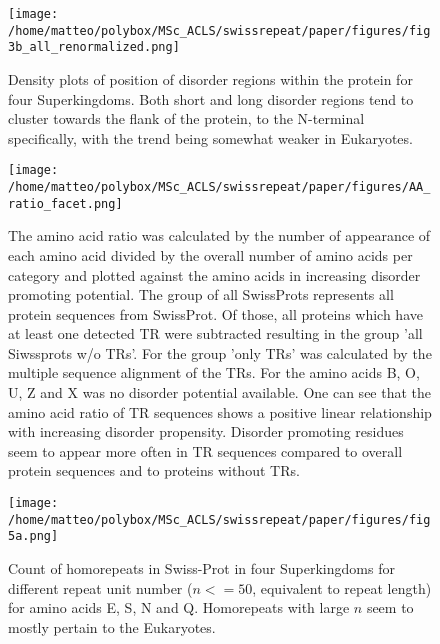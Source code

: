\documentclass[a4,center,fleqn]{NAR}
\begin{document}
\begin{figure}[t]
\begin{center}
\texttt{[image: /home/matteo/polybox/MSc\_ACLS/swissrepeat/paper/figures/fig3b\_all\_renormalized.png]}
\end{center}
\caption{ Density plots of position of disorder regions within the protein for four Superkingdoms. Both short and long disorder regions tend to cluster towards the flank of the protein, to the N-terminal specifically, with the trend being somewhat weaker in Eukaryotes.}
\label{sup:fig3b}
\end{figure}

\begin{figure*}[t]
\begin{center}
\texttt{[image: /home/matteo/polybox/MSc\_ACLS/swissrepeat/paper/figures/AA\_ratio\_facet.png]}
\end{center}
\caption{The amino acid ratio was calculated by the number of appearance of each amino acid divided by the overall number of amino acids per category and plotted against the amino acids in increasing disorder promoting potential. The group of all SwissProts represents all protein sequences from SwissProt. Of those, all proteins which have at least one detected TR were subtracted resulting in the group 'all Siwssprots w/o TRs'. For the group 'only TRs' was calculated by the multiple sequence alignment of the TRs. For the amino acids B, O, U, Z and X was no disorder potential available. 
One can see that the amino acid ratio of TR sequences shows a positive linear relationship with increasing disorder propensity. Disorder promoting residues seem to appear more often in TR sequences compared to overall protein sequences and to proteins without TRs.}
\label{sup:AA_ratio_facet}
\end{figure*}

\begin{figure*}[t]
\begin{center}
\texttt{[image: /home/matteo/polybox/MSc\_ACLS/swissrepeat/paper/figures/fig5a.png]}
\end{center}
\caption{Count of homorepeats in Swiss-Prot in four Superkingdoms for different repeat unit number ($n <= 50$, equivalent to repeat length) for amino acids E, S, N and Q. Homorepeats with large $n$ seem to mostly pertain to the Eukaryotes.}
\label{sup:fig5a}
\end{figure*}
\end{document}
